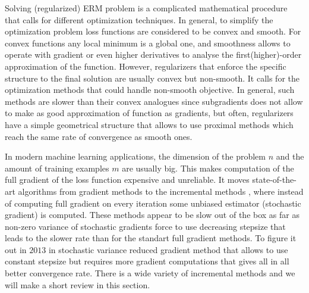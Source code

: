Solving (regularized) ERM problem is a complicated mathematical procedure that calls for different optimization techniques. In general, to simplify the optimization problem loss functions are considered to be convex and smooth. For convex functions any local minimum is a global one, and smoothness allows to operate with gradient or even higher derivatives to analyse the first(higher)-order approximation of the function. However, regularizers that enforce the specific structure to the final solution are usually convex but non-smooth. It calls for the optimization methods that could handle non-smooth objective. In general, such methods are slower than their convex analogues since subgradients does not allow to make as good approximation of function as gradients, but often, regularizers have a simple geometrical structure that allows to use proximal methods which reach the same rate of convergence as smooth ones.

In modern machine learning applications, the dimension of the problem $n$ and the amount of training examples $m$ are usually big. This makes computation of the full gradient of the loss function expensive and unreliable. It moves state-of-the-art algorithms from gradient methods \cite{nesterov-book} to the incremental methods \cite{bertsekas2011incremental, bottou2010large}, where instead of computing full gradient on every iteration some unbiased estimator (stochastic gradient) is computed. These methods appear to be slow out of the box as far as non-zero variance of stochastic gradients force to use decreasing stepsize that leads to the slower rate than for the standart full gradient methods. To figure it out in $2013$ in \cite{johnson2013accelerating} stochastic variance reduced gradient method that allows to use constant stepsize but requires more gradient computations that gives all in all better convergence rate. {\color{blue}There is a wide variety of incremental methods and we will make a short review in this section.}

